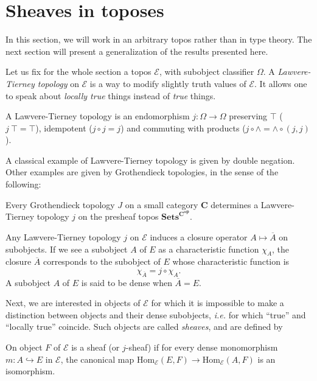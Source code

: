 \documentclass[notfinal]{jfrarticle}
\newcommand \True {\top}
\newcommand \closure[1] {\overline{#1}}
\newcommand \Char[1] {\chi_{#1}}%
\newcommand \Hom[1] {\mathrm{Hom}_{#1}}
\newcommand{\ie}{\emph{i.e.}}
\begin{document}
\section{Sheaves in toposes}
\label{sec:sheaf_topos}

In this section, we will work in an arbitrary topos rather than in
type theory. The next section will present a generalization of the
results presented here.

Let us fix for the whole section a topos $\mathcal E$, with subobject
classifier $\Omega$. A {\em Lawvere-Tierney topology} on $\mathcal E$
is a way to modify slightly truth values of $\mathcal E$. It allows one to
speak about {\em locally true} things instead of {\em true} things.

\begin{defi}\label{defi:LT}
  A Lawvere-Tierney topology is an endomorphism $j:\Omega \to \Omega$
  preserving $\True$ ($j \ \True = \True$), idempotent ($j\circ j =
  j$) and commuting with products ($j \circ \wedge = \wedge \circ (j,j)$).
\end{defi}

A classical example of Lawvere-Tierney topology is given by double
negation. Other examples are given by Grothendieck topologies, in the
sense of the following:

\begin{thm}
  Every Grothendieck topology $J$ on a small category $\mathbf C$ determines a
  Lawvere-Tierney topology $j$ on the presheaf topos
  $\mathbf{Sets}^{\mathbf C^{\mathbf{op}}}$.
\end{thm}

Any Lawvere-Tierney topology $j$ on $\mathcal E$ induces a closure operator
$A \mapsto \closure{A}$ on subobjects. If we see a subobject $A$ of $E$
as a characteristic function $\Char{A}$, the closure $\closure{A}$
corresponds to the subobject of $E$ whose characteristic function is 
%
\[
\Char{\closure{A}} = j \circ \Char{A}.
\]%
%
A subobject $A$ of $E$ is said to
be dense when $\closure{A} = E$.

Next, we are interested in objects of $\mathcal E$ for which it is
impossible to make a distinction between objects and their dense
subobjects, \ie{} for which ``true'' and ``locally true''
coincide. Such objects are called {\em sheaves}, and are defined by

\begin{defi}
  On object $F$ of $\mathcal E$ is a sheaf (or $j$-sheaf) if for every
  dense monomorphism $m: A \hookrightarrow E$ in $\mathcal E$, the
  canonical map $\Hom{\mathcal E}(E,F) \rightarrow \Hom{\mathcal E}(A,F)$ is an
isomorphism.
\end{defi}
\end{document}
